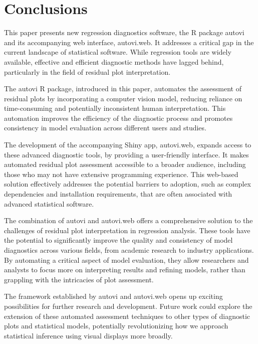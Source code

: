 \documentclass[
doublespace,
  times]{anzsauth}
\begin{document}
\section{Conclusions}\label{sec-autovi-conclusion}

This paper presents new regression diagnostics software, the \textsf{R}
package \textsf{autovi} and its accompanying web interface,
\textsf{autovi.web}. It addresses a critical gap in the current
landscape of statistical software. While regression tools are widely
available, effective and efficient diagnostic methods have lagged
behind, particularly in the field of residual plot interpretation.

The \textsf{autovi} \textsf{R} package, introduced in this paper,
automates the assessment of residual plots by incorporating a computer
vision model, reducing reliance on time-consuming and potentially
inconsistent human interpretation. This automation improves the
efficiency of the diagnostic process and promotes consistency in model
evaluation across different users and studies.

The development of the accompanying \textsf{Shiny} app,
\textsf{autovi.web}, expands access to these advanced diagnostic tools,
by providing a user-friendly interface. It makes automated residual plot
assessment accessible to a broader audience, including those who may not
have extensive programming experience. This web-based solution
effectively addresses the potential barriers to adoption, such as
complex dependencies and installation requirements, that are often
associated with advanced statistical software.

The combination of \textsf{autovi} and \textsf{autovi.web} offers a
comprehensive solution to the challenges of residual plot interpretation
in regression analysis. These tools have the potential to significantly
improve the quality and consistency of model diagnostics across various
fields, from academic research to industry applications. By automating a
critical aspect of model evaluation, they allow researchers and analysts
to focus more on interpreting results and refining models, rather than
grappling with the intricacies of plot assessment.

The framework established by \textsf{autovi} and \textsf{autovi.web}
opens up exciting possibilities for further research and development.
Future work could explore the extension of these automated assessment
techniques to other types of diagnostic plots and statistical models,
potentially revolutionizing how we approach statistical inference using
visual displays more broadly.
\end{document}

